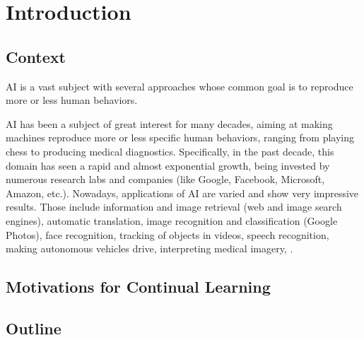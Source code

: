 \chapter{Introduction}
\label{chapter:introduction}

{}


\section{Context}

\acf{AI} is a vast subject with several approaches whose common goal is to reproduce more or less
human behaviors.

\acf{AI} has been a subject of great interest for many decades, aiming at making machines reproduce
more or less specific human behaviors, ranging from playing chess to producing medical diagnostics.
Specifically, in the past decade, this domain has seen a rapid and almost exponential growth, being
invested by numerous research labs and companies (like Google, Facebook, Microsoft, Amazon, etc.).
Nowadays, applications of \ac{AI} are varied and show very impressive results. Those include
information and image retrieval (web and image search engines), automatic translation, image
recognition and classification (\eg Google Photos), face recognition, tracking of objects in videos,
speech recognition, making autonomous vehicles drive, interpreting medical imagery, \etc.

\section{Motivations for Continual Learning}

\section{Outline}

